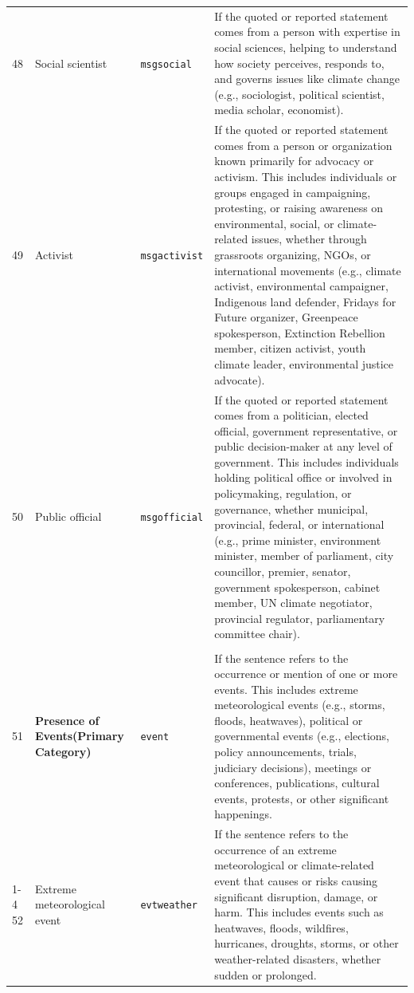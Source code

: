 \documentclass[12pt]{article}
\renewcommand\_{\texttt{\detokenize{_}\allowbreak}}
\begin{document}
{\begin{longtable}{p{0.5cm}p{4.5cm}p{2.8cm}p{13.5cm}}
48 & Social scientist & \texttt{msg\_social} & If the quoted or reported statement comes from a person with expertise in social sciences, helping to understand how society perceives, responds to, and governs issues like climate change (e.g., sociologist, political scientist, media scholar, economist). \\
49 & Activist & \texttt{msg\_activist} & If the quoted or reported statement comes from a person or organization known primarily for advocacy or activism. This includes individuals or groups engaged in campaigning, protesting, or raising awareness on environmental, social, or climate-related issues, whether through grassroots organizing, NGOs, or international movements (e.g., climate activist, environmental campaigner, Indigenous land defender, Fridays for Future organizer, Greenpeace spokesperson, Extinction Rebellion member, citizen activist, youth climate leader, environmental justice advocate). \\
50 & Public official & \texttt{msg\_official} & If the quoted or reported statement comes from a politician, elected official, government representative, or public decision-maker at any level of government. This includes individuals holding political office or involved in policymaking, regulation, or governance, whether municipal, provincial, federal, or international (e.g., prime minister, environment minister, member of parliament, city councillor, premier, senator, government spokesperson, cabinet member, UN climate negotiator, provincial regulator, parliamentary committee chair). \\
\midrule
\rowcolor{gray!8}
\multicolumn{4}{l}{\textit{Events}} \\
\midrule
51 & \textbf{Presence of Events\newline (Primary Category)} & \texttt{event} & If the sentence refers to the occurrence or mention of one or more events. This includes extreme meteorological events (e.g., storms, floods, heatwaves), political or governmental events (e.g., elections, policy announcements, trials, judiciary decisions), meetings or conferences, publications, cultural events, protests, or other significant happenings. \\
\cmidrule(lr){1-4}
52 & Extreme meteorological event & \texttt{evt\_weather} & If the sentence refers to the occurrence of an extreme meteorological or climate-related event that causes or risks causing significant disruption, damage, or harm. This includes events such as heatwaves, floods, wildfires, hurricanes, droughts, storms, or other weather-related disasters, whether sudden or prolonged. \\

\end{longtable}}
\end{document}
